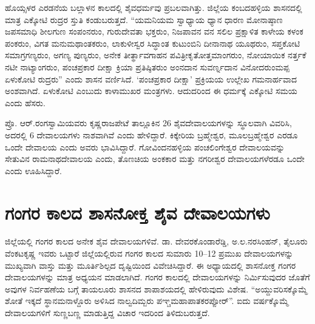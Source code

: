 ಹೊಯ್ಸಳರ ಎರಡನೆಯ ಬಲ್ಲಾಳನ ಕಾಲದಲ್ಲಿ ಶೈವಧರ್ಮವು ಪ್ರಬಲವಾಗಿತ್ತು. ಜಿಲ್ಲೆಯ ಕಂಬದಹಳ್ಳಿಯ ಶಾಸನದಲ್ಲಿ ಮಾತ್ರ ಎಕ್ಕೋಟಿ ರುದ್ರರ ಸ್ತುತಿ ಕಂಡುಬರುತ್ತದೆ. “ಯಮನಿಯಮ ಸ್ವಾಧ್ಯಾಯ ಧ್ಯಾನ ಧಾರಣ ಮೋನಾಷ್ಠಾಣ ಜಪಸಮಾಧಿ ಶೀಲಗುಣ ಸಂಪಂನರುಂ, ಗುರುದೇವತಾ ಭಕ್ತರುಂ, ನಿಜಪಾವನ ವನ ಸಲಿಲ ಪ್ರಕ್ಷಾಳಿತ ಕಾಳೇಯ ಕಳಂಕ ಪಂಕರುಂ, ವಿಗತ ಮನುಮಥಾಂತಕರುಂ, ಲಾಕುಳೀಸ್ವರ ಸಿದ್ಧಾಂತ ಕುಟುಂಬಿನಿ ದೀನಾನಾಥ ಯೂಥರುಂ, ಸಪ್ತಕೋಟಿ ಸಮಾಗ್ರಗಣ್ಯರುಂ, ಅಗಣ್ಯ ಪುಣ್ಯರುಂ, ಅನೇಕ ತೀರ್ತ್ಥಾವಗಾಹನ ಪವಿತ್ರೀಕೃತೋತ್ತಮಾಂಗರುಂ, ನೋಯಾಯಿಕ ನರ್ತ್ತಕೆ ನಟೀ ನಾಟ್ಯಾಂಗರುಂ, ಪಂಚಪ್ರಕಾರ ದೀಕ್ಷಾ ಕ್ರಿಯಾ ಪ್ರತಿಷ್ಠಿತರುಂ ಅಂನದಾನ ಸುವರ್ಣ್ನದಾನ ವಿನೋದರುಂಮಪ್ಪ ಏಳುಕೋಟಿ ರುದ್ರರು” ಎಂದು ಶಾಸನ ವರ್ಣಿಸಿದೆ. ‘ಪಂಚಪ್ರಕಾರ ದೀಕ್ಷಾ’ ಪ್ರಕ್ರಿಯಯ ಉಲ್ಲೇಖ ಗಮನಾರ್ಹವಾದ ಅಂಶವಾಗಿದೆ. ಏಳುಕೋಟಿ ಎಂಬುದು ಕಾಳಾಮುಖರ ಮಂತ್ರಗಳು. ಆದುದರಿಂದ ಈ ಧರ್ಮಕ್ಕೆ ಎಕ್ಕೋಟಿ ಸಮಯ ಎಂದು ಹೆಸರು.

ಪ್ರೊ. ಆರ್​.ರಂಗಸ್ವಾಮಿಯವರು ಕೃಷ್ಣರಾಜಪೇಟೆ ತಾಲ್ಲೂಕಿನ 26 ಶೈವದೇವಾಲಯಗಳನ್ನು ಸ್ಥೂಲವಾಗಿ ವಿವರಿಸಿ, ಅದರಲ್ಲಿ 6 ದೇವಾಲಯಗಳು ನಾಶವಾಗಿವೆ ಎಂದು ಹೇಳಿದ್ದಾರೆ. ಕಿಕ್ಕೇರಿಯ ಬ್ರಹ್ಮೇಶ್ವರ, ಮೂಲಬ್ರಹ್ಮೇಶ್ವರ ಎರಡೂ ಒಂದೇ ದೇವಾಲಯ ಎಂದು ಅವರು ಭಾವಿಸಿದ್ದಾರೆ. ಗೋವಿಂದನಹಳ್ಳಿಯ ಪಂಚಲಿಂಗೇಶ್ವರ ದೇವಾಲಯವನ್ನು ಸೇತುವಿನ ರಾಮನಾಥದೇವಾಲಯ ಎಂದು, ತೊಣಚಿಯ ಅಂಕಕಾರ ಮತ್ತು ನಗರೀಶ್ವರ ದೇವಾಲಯಗಳೆರಡೂ ಒಂದೇ ಎಂದು ಊಹಿಸಿದ್ದಾರೆ.


\section{ಗಂಗರ ಕಾಲದ ಶಾಸನೋಕ್ತ ಶೈವ ದೇವಾಲಯಗಳು}

ಜಿಲ್ಲೆಯಲ್ಲಿ ಗಂಗರ ಕಾಲದ ಅನೇಕ ಶೈವ ದೇವಾಲಯಗಳಿವೆ. ಡಾ. ದೇವರಕೊಂಡಾರೆಡ್ಡಿ, ಅ.ಲ.ನರಸಿಂಹನ್​, ತೈಲೂರು ವೆಂಕಟಕೃಷ್ಣ ಇವರು ಒಟ್ಟಾರೆ ಜಿಲ್ಲೆಯಲ್ಲಿರುವ ಗಂಗರ ಕಾಲದ ಸುಮಾರು 10–12 ಪ್ರಮುಖ ದೇವಾಲಯಗಳನ್ನು ಮುಖ್ಯವಾಗಿ ವಾಸ್ತು ಮತ್ತು ಮೂರ್ತಿಶಿಲ್ಪದ ದೃಷ್ಟಿಯಿಂದ ವಿವೇಚಿಸಿದ್ದಾರೆ. ಈ ಅಧ್ಯಾಯದಲ್ಲಿ ಶಾಸನೋಕ್ತ ಗಂಗರ ದೇವಾಲಯಗಳನ್ನು ಮಾತ್ರ ಅಧ್ಯಯನ ಮಾಡಲಾಗಿದೆ. ಗಂಗರ ಕಾಲದಲ್ಲಿ ದೇವಾಲಯಗಳನ್ನು ನಿರ್ಮಿಸುವುದರ ಜೊತೆಗೆ ಅವುಗಳ ನಿರ್ವಹಣೆಯ ಬಗ್ಗೆ ತಾಯಲೂರು ಶಾಸನದ ಶಾಪಾಶಯದಲ್ಲಿ ಹೇಳಿರುವುದು ವಿಶೇಷ. “ಅಯ್ದುವರಿಸಕ್ಕೊಮ್ಮೆ ಶೋತೆ ಇಕ್ಕದೆ ಸ್ಥಾನಮನಾಳ್ದೊರು ಅಳಿಸಿದ ನಾಲ್ವದಿಮ್ಬರು ಪಞ್ಚಮಹಾಪಾತಕರಪ್ಪೋರ್​”. ಐದು ವರ್ಷಕ್ಕೊಮ್ಮೆ ದೇವಾಲಯಗಳಿಗೆ ಸುಣ್ಣಬಣ್ಣ ಮಾಡುತ್ತಿದ್ದ ವಿಚಾರ ಇದರಿಂದ ತಿಳಿದುಬರುತ್ತದೆ.


